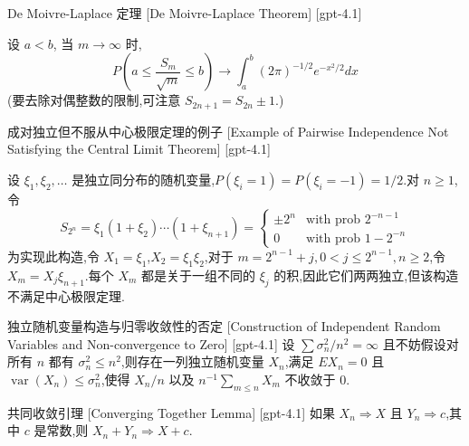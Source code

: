 \documentclass[UTF8]{ctexart}
\begin{document}
    \begin{thm}
        {De Moivre-Laplace 定理}
        [De Moivre-Laplace Theorem]
        [gpt-4.1]
        
设 $a < b$, 当 $m \to \infty$ 时,
\[
P\left(a \leq \frac{S_m}{\sqrt{m}} \leq b\right) \to \int_{a}^{b} (2\pi)^{-1/2} e^{-x^2/2} dx
\]
(要去除对偶整数的限制,可注意 $S_{2n+1} = S_{2n} \pm 1$.)

    \end{thm}
    
    
    
    \begin{xmp}
        {成对独立但不服从中心极限定理的例子}
        [Example of Pairwise Independence Not Satisfying the Central Limit Theorem]
        [gpt-4.1]
        
设 $\xi_1, \xi_2, \ldots$ 是独立同分布的随机变量,$P(\xi_i = 1) = P(\xi_i = -1) = 1/2$.对 $n \geq 1$,令
\[
S_{2^n} = \xi_1 (1 + \xi_2) \cdots (1 + \xi_{n+1}) = 
\begin{cases}
\pm 2^n & \text{with prob } 2^{-n-1} \\
0 & \text{with prob } 1 - 2^{-n}
\end{cases}
\]
为实现此构造,令 $X_1 = \xi_1$,$X_2 = \xi_1 \xi_2$,对于 $m = 2^{n-1} + j, 0 < j \leq 2^{n-1}, n \geq 2$,令 $X_m = X_j \xi_{n+1}$.每个 $X_m$ 都是关于一组不同的 $\xi_j$ 的积,因此它们两两独立,但该构造不满足中心极限定理.

    \end{xmp}
    
    
    
    \begin{thm}
        {独立随机变量构造与归零收敛性的否定}
        [Construction of Independent Random Variables and Non-convergence to Zero]
        [gpt-4.1]
        设 $\sum \sigma_n^2 / n^2 = \infty$ 且不妨假设对所有 $n$ 都有 $\sigma_n^2 \leq n^2$,则存在一列独立随机变量 $X_n$,满足 $E X_n = 0$ 且 $\operatorname{var}(X_n) \leq \sigma_n^2$,使得 $X_n / n$ 以及 $n^{-1} \sum_{m \leq n} X_m$ 不收敛于 0.
    \end{thm}
    
    
    
    \begin{lma}
        {共同收敛引理}
        [Converging Together Lemma]
        [gpt-4.1]
        如果 $X_n \Rightarrow X$ 且 $Y_n \Rightarrow c$,其中 $c$ 是常数,则 $X_n + Y_n \Rightarrow X + c$.
    \end{lma}
    
\end{document}

